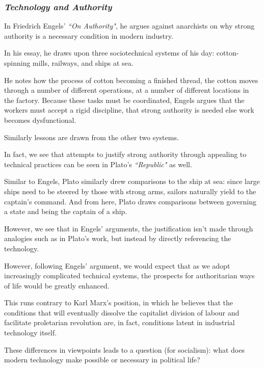 \documentclass[openany]{book}
\begin{document}
\subsubsection{\textit{Technology and Authority}}
\begin{example}
	In Friedrich Engels' \textit{``On Authority"}, he argues against anarchists on why strong authority is a necessary condition in modern industry.
	
	In his essay, he draws upon three sociotechnical systems of his day: cotton-spinning mills, railways, and ships at sea.
	
	He notes how the process of cotton becoming a finished thread, the cotton moves through a number of different operations, at a number of different locations in the factory. Because these tasks must be coordinated, Engels argues that the workers must accept a rigid discipline, that strong authority is needed else work becomes dysfunctional.
	
	Similarly lessons are drawn from the other two systems.
\end{example}

\begin{example}
	In fact, we see that attempts to justify strong authority through appealing to technical practices can be seen in Plato's \textit{``Republic"} as well.
	
	Similar to Engels, Plato similarly drew comparisons to the ship at sea: since large ships need to be steered by those with strong arms, sailors naturally yield to the captain's command. And from here, Plato draws comparisons between governing a state and being the captain of a ship.
\end{example}

However, we see that in Engels' arguments, the justification isn't made through analogies such as in Plato's work, but instead by directly referencing the technology.

However, following Engels' argument, we would expect that as we adopt increasingly complicated technical systems, the prospects for authoritarian ways of life would be greatly enhanced.

This runs contrary to Karl Marx's position, in which he believes that the conditions that will eventually dissolve the capitalist division of labour and facilitate proletarian revolution are, in fact, conditions latent in industrial technology itself.

These differences in viewpoints leads to a question (for socialism): what does modern technology make possible or necessary in political life?
\end{document}
